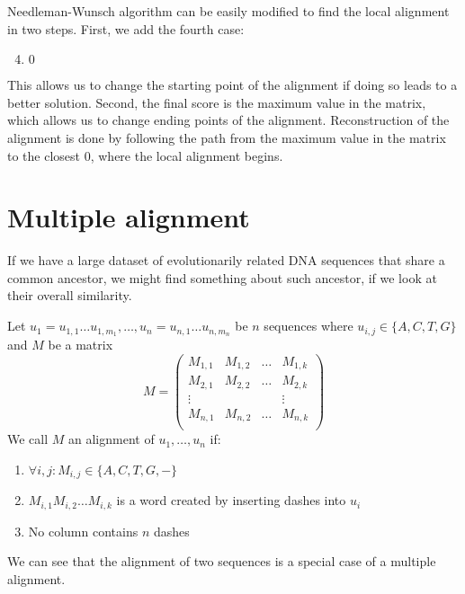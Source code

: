 Needleman-Wunsch algorithm can be easily modified to find the local alignment in two steps.
First, we add the fourth case:
\begin{enumerate}
 \setcounter{enumi}{3}
\item $0$
\end{enumerate}
This allows us to change the starting point of the alignment if doing so leads to a better solution.
Second, the final score is the maximum value in the matrix, which allows us to change ending points of the alignment.
Reconstruction of the alignment is done by following the path from the maximum value in the matrix to the closest $0$, 
where the local alignment begins.

\section{Multiple alignment}
If we have a large dataset of evolutionarily related DNA sequences that share a common ancestor, we might find something about such ancestor, if we look at their overall similarity.

\begin{definition}
Let $u_1=u_{1,1} \dots u_{1,m_1}, \ldots, u_n=u_{n,1} \dots u_{n,m_n}$ be $n$ sequences where $u_{i,j} \in \{A, C, T, G\}$ and $M$ be a matrix
$$M=
\begin{pmatrix}
  M_{1,1} & M_{1,2} & \dots & M_{1,k} \\
  M_{2,1} & M_{2,2} & \dots & M_{2,k} \\
  \vdots&&&\vdots\\
  M_{n,1} & M_{n,2} & \dots & M_{n,k} \\
\end{pmatrix}$$
We call $M$ an alignment of $u_1, \dots, u_n$ if:
\begin{enumerate}
\item $\forall i,j : M_{i,j}\in \{A,C,T,G,-\}$
\item $M_{i,1} M_{i,2} \dots M_{i,k}$ is a word created by inserting dashes into $u_i$
\item No column contains $n$ dashes
\end{enumerate}
\end{definition}

We can see that the alignment of two sequences is a special case of a multiple alignment.

